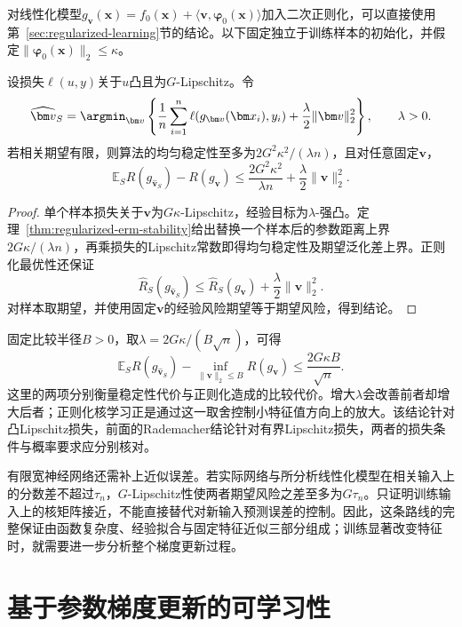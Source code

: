 对线性化模型$g_{\bm v}(\bm x)=f_0(\bm x)+\langle\bm v,\bm\varphi_0(\bm x)\rangle$加入二次正则化，可以直接使用第~\ref{sec:regularized-learning}节的结论。以下固定独立于训练样本的初始化，并假定$\|\bm\varphi_0(\bm x)\|_2\leq\kappa$。

\begin{theorem}[正则化固定特征模型的稳定性]
\label{thm:ntk-stability-risk}
设损失$\ell(u,y)$关于$u$凸且为$G$-Lipschitz。令
\[
 \widehat{\bm v}_S=\argmin_{\bm v}
 \left\{\frac1n\sum_{i=1}^n\ell(g_{\bm v}(\bm x_i),y_i)
       +\frac\lambda2\|\bm v\|_2^2\right\},\qquad\lambda>0.
\]
若相关期望有限，则算法的均匀稳定性至多为$2G^2\kappa^2/(\lambda n)$，且对任意固定$\bm v$，
\[
 \mathbb E_S R(g_{\widehat{\bm v}_S})-R(g_{\bm v})
 \leq\frac{2G^2\kappa^2}{\lambda n}+\frac\lambda2\|\bm v\|_2^2.
\]
\end{theorem}
\begin{proof}
单个样本损失关于$\bm v$为$G\kappa$-Lipschitz，经验目标为$\lambda$-强凸。定理~\ref{thm:regularized-erm-stability}给出替换一个样本后的参数距离上界$2G\kappa/(\lambda n)$，再乘损失的Lipschitz常数即得均匀稳定性及期望泛化差上界。正则化最优性还保证
\[
 \hat R_S(g_{\widehat{\bm v}_S})
 \leq\hat R_S(g_{\bm v})+\frac\lambda2\|\bm v\|_2^2.
\]
对样本取期望，并使用固定$\bm v$的经验风险期望等于期望风险，得到结论。
\end{proof}

固定比较半径$B>0$，取$\lambda=2G\kappa/(B\sqrt n)$，可得
\begin{equation}
 \mathbb E_S R(g_{\widehat{\bm v}_S})
 -\inf_{\|\bm v\|_2\leq B}R(g_{\bm v})
 \leq\frac{2G\kappa B}{\sqrt n}.
 \label{eq:ntk-sample-risk}
\end{equation}
这里的两项分别衡量稳定性代价与正则化造成的比较代价。增大$\lambda$会改善前者却增大后者；正则化核学习正是通过这一取舍控制小特征值方向上的放大。该结论针对凸Lipschitz损失，前面的Rademacher结论针对有界Lipschitz损失，两者的损失条件与概率要求应分别核对。

有限宽神经网络还需补上近似误差。若实际网络与所分析线性化模型在相关输入上的分数差不超过$\tau_n$，$G$-Lipschitz性使两者期望风险之差至多为$G\tau_n$。只证明训练输入上的核矩阵接近，不能直接替代对新输入预测误差的控制。因此，这条路线的完整保证由函数复杂度、经验拟合与固定特征近似三部分组成；训练显著改变特征时，就需要进一步分析整个梯度更新过程。

\section{基于参数梯度更新的可学习性}
\label{sec:implicit-bias}

